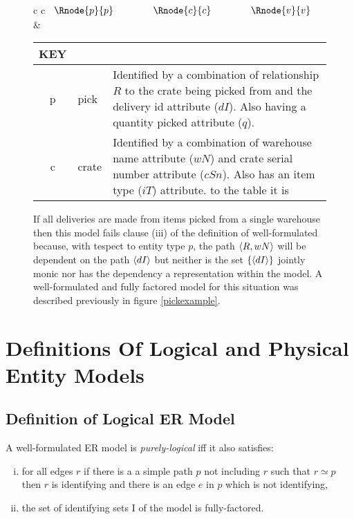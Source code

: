 \documentclass[10pt,a4paper]{article}
\newcommand{\term}[1]{\textit{{#1}}}
\begin{document}
\begin{figure} [h]
\begin{center}
\begin{tabular}{c c}
$
\begin{array}{cp{0.75cm}cp{0.75cm}c}
   \Rnode{p}{p}     & & \Rnode{c}{c} & & \Rnode{v}{v}    
\end{array}
$
\idcomp
{} 
\idcomp
{} 
\idcomp
{}
\idcomp
{}
& \footnotesize
\begin{tabular}{c p{1.5cm} p{4cm}}
KEY && \\
\hline
p & pick & Identified by a combination of relationship $R$ to the crate being picked from
                and the delivery id attribute ($dI$). Also  having a quantity picked 
								attribute ($q$).\\
c & crate & Identified by a combination of warehouse name attribute ($wN$)
              and crate serial number attribute ($cSn$). Also has an item type ($iT$) attribute.
 to the table it is 
\end{tabular} 
\end{tabular}
\end{center}
\caption{If all deliveries are made from items picked from a single warehouse 
then this model fails clause (iii) of the definition of well-formulated because, with tespect to entity type $p$, the path $\langle R,wN\rangle$ will be dependent on the path $\langle dI\rangle$ but neither is the set 
$\{\langle dI\rangle\}$ jointly monic nor has the dependency a representation within the model. A well-formulated and fully factored model for this situation was described previously in 
figure \ref{pickexample}.
}
\label{pickexamplebeforenormalisation}
\end{figure}

\section{Definitions Of Logical and Physical Entity Models}

	
\subsection{Definition of Logical ER Model}

\begin{definition}
A well-formulated ER model is \term{purely-logical}  iff it 
also satisfies:
\begin{enumerate}[(i)]
\item
for all edges $r$ if there is a
a simple path $p$  not including $r$ such that
 $r \simeq p$  then $r$ is identifying and there is an edge $e$ in $p$ which is not identifying,
\item the set of identifying sets I of the model is fully-factored.
\end{enumerate} 
\end{definition}
\end{document}
